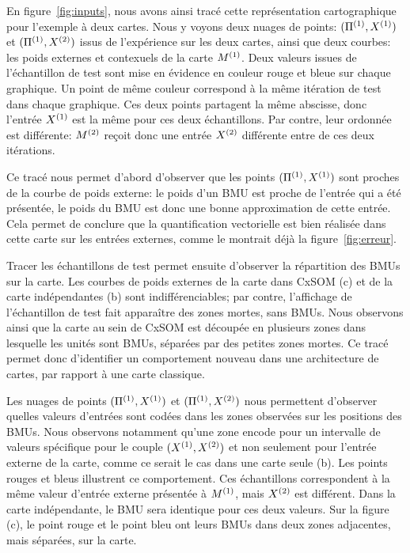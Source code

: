 \documentclass[../main]{subfiles}
\begin{document}
En figure~\ref{fig:inputs}, nous avons ainsi tracé cette représentation cartographique pour l'exemple à deux cartes.
Nous y voyons deux nuages de points: $(\Pi^{({1})},X^{({1})})$ et $(\Pi^{({1})},X^{({2})})$ issus de l'expérience sur les deux cartes, ainsi que deux courbes: les poids externes et contexuels de la carte $M^{({1})}$.
Deux valeurs issues de l'échantillon de test sont mise en évidence en couleur rouge et bleue sur chaque graphique. Un point de même couleur correspond à la même itération de test dans chaque graphique. Ces deux points partagent la même abscisse, donc l'entrée $X^{({1})}$ est la même pour ces deux échantillons. Par contre, leur ordonnée est différente: $M^{({2})}$ reçoit donc une entrée $X^{({2})}$ différente entre de ces deux itérations.

Ce tracé nous permet d'abord d'observer que les points $(\Pi^{({1})},X^{({1})})$ sont proches de la courbe de poids externe: le poids d'un BMU est proche de l'entrée qui a été présentée, le poids du BMU est donc une bonne approximation de cette entrée. Cela permet de conclure que la quantification vectorielle est bien réalisée dans cette carte sur les entrées externes, comme le montrait déjà la figure~\ref{fig:erreur}.

Tracer les échantillons de test permet ensuite d'observer la répartition des BMUs sur la carte. Les courbes de poids externes de la carte dans CxSOM (c) et de la carte indépendantes (b) sont indifférenciables; par contre, l'affichage de l'échantillon de test fait apparaître des zones mortes, sans BMUs. Nous observons ainsi que la carte au sein de CxSOM est découpée en plusieurs zones dans lesquelle les unités sont BMUs, séparées par des petites zones mortes. Ce tracé permet donc d'identifier un comportement nouveau dans une architecture de cartes, par rapport à une carte classique.

Les nuages de points $(\Pi^{({1})},X^{({1})})$ et $(\Pi^{({1})},X^{({2})})$ nous permettent d'observer quelles valeurs d'entrées sont codées dans les zones observées sur les positions des BMUs.
Nous observons notamment qu'une zone encode pour un intervalle de valeurs spécifique pour le couple $(X^{({1})},X^{({2})})$ et non seulement pour l'entrée externe de la carte, comme ce serait le cas dans une carte seule (b). Les points rouges et bleus illustrent ce comportement.
Ces échantillons correspondent à la même valeur d'entrée externe présentée à $M^{({1})}$, mais $X^{({2})}$ est différent.
Dans la carte indépendante, le BMU sera identique pour ces deux valeurs.
Sur la figure (c), le point rouge et le point bleu ont leurs BMUs dans deux zones adjacentes, mais séparées, sur la carte.
\end{document}
